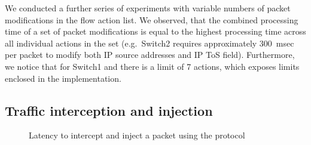 We conducted a further series of experiments with variable numbers of packet
modifications in the flow action list. We observed, that the combined processing
time of a set of packet modifications is equal to the highest processing time
across all individual actions in the set (e.g.~Switch2 requires approximately
300~msec per packet to modify both IP source addresses and IP ToS field).
Furthermore, we notice that for Switch1 and \ovs there is a limit of 7
actions, which exposes limits enclosed in the implementation.

\subsection{Traffic interception and injection}\label{sec:results-pktin}

\begin{figure}[ht]
  \begin{center}
  \end{center}
  \caption{Latency to intercept and inject a packet using the \of protocol}
  \label{fig:pkt_in_out_delay}
\end{figure}

